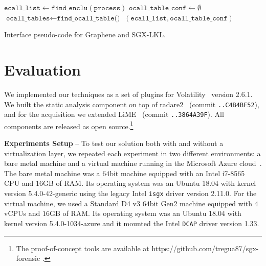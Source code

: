 \begin{algorithm}[t]
	\SetAlgoLined
	\DontPrintSemicolon
	 {
		$\texttt{ecall\_list} \gets
		\texttt{find\_enclu}(\texttt{process})$\;\label{alg:cont:2}
		$\texttt{ocall\_table\_conf} \gets \emptyset$\;\label{alg:cont:3}
		$\texttt{ocall\_tables} \gets
		\texttt{find\_ocall\_table()}$\;\label{alg:cont:4}
		\Return $(\texttt{ecall\_list},
		\texttt{ocall\_table\_conf})$\;\label{alg:cont:9}
	}
	\caption{Interface pseudo-code for Graphene and SGX-LKL.}
	\label{alg:interface-graphene-sgxlkl}
\end{algorithm}


\section{Evaluation}
\label{sec:memfor_evaluation}

We implemented our techniques as a set of plugins for 
Volatility~\citep{volatility} 
version 2.6.1. We built the static analysis component on top of 
radare2~\citep{radare2} 
(commit \texttt{..C4B4BF52}), and for the acquisition we extended 
LiME~\citep{lime} (commit \texttt{..3864A39F}).
All components are released as open source.\footnote{The proof-of-concept tools 
	are available at https://github.com/tregua87/sgx-forensic .}

\vspace{0.2cm}
\noindent \textbf{Experiments Setup} -- 
To test our solution both with and without a virtualization layer, we
repeated each experiment in two different environments: a bare metal
machine and a virtual machine running in the Microsoft Azure
cloud~\citep{azure}.
The bare metal machine was a $64$bit machine equipped with an Intel i7-8565 CPU
and $16$GB of RAM. Its operating system was an Ubuntu 18.04 with kernel version
5.4.0-42-generic using the legacy Intel \texttt{isgx} driver version 2.11.0.
For the virtual machine, we used a Standard D4 v3 $64$bit Gen2 machine equipped
with $4$ vCPUs and $16$GB of RAM. Its operating system was an Ubuntu 18.04 with
kernel version 5.4.0-1034-azure and it mounted the Intel \texttt{DCAP}
driver version 1.33.

